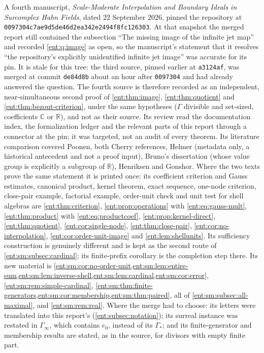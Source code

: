 \documentclass[11pt]{article}
\theoremstyle{plain}
\theoremstyle{plain}
\theoremstyle{plain}
\theoremstyle{definition}
\theoremstyle{definition}
\theoremstyle{definition}
\theoremstyle{definition}
\theoremstyle{remark}
\newcommand{\C}{\mathbb C}\newcommand{\R}{\mathbb R}
\begin{document}
A fourth manuscript, \emph{Scale-Moderate Interpolation and Boundary Ideals
in Surcomplex Hahn Fields}, dated 22 September 2026, pinned the repository
at \texttt{0097304c7ae9d5de46d2\allowbreak ea342e2494f8fc126303}. At that snapshot the
merged report still contained the subsection ``The missing image of the
infinite jet map'' and recorded \cref{ent:q:image} as open, so the
manuscript's statement that it resolves ``the repository's explicitly
unidentified infinite jet image'' was accurate for its pin. It is stale for
this tree: the third source, pinned earlier at \texttt{a3124af}, was merged
at commit \texttt{de84d8b} about an hour after \texttt{0097304} and had
already answered the question. The fourth source is therefore recorded as an
independent, near-simultaneous second proof of \cref{ent:thm:image},
\cref{ent:thm:quotient} and \cref{ent:thm:bezout-criterion}, under the same
hypotheses ($\Gamma$ divisible and set-sized, coefficients $\C$ or $\R$), and
not as their source. Its review read the documentation index, the
formalization ledger and the relevant parts of this report through a
connector at the pin; it was targeted, not an audit of every theorem. Its
literature comparison covered Poonen, both Cherry references, Helmer
(metadata only, a historical antecedent and not a proof input), Bruno's
dissertation (whose value group is explicitly a subgroup of $\R$), Henriksen
and Gonshor. Where the two texts prove the same statement it is printed once:
its coefficient criterion and Gauss estimates, canonical product, kernel
theorem, exact sequence, one-node criterion, close-pair example, factorial
example, order-unit check and unit test for shell algebras are
\cref{ent:thm:criterion}, \cref{ent:prop:operations} with
\eqref{ent:eq:gauss-mult}, \cref{ent:thm:product} with
\eqref{ent:eq:productcoef}, \cref{ent:prop:kernel-direct},
\cref{ent:thm:quotient}, \cref{ent:cor:single-node},
\cref{ent:thm:close-pair}, \cref{ent:cor:no-interpolation},
\cref{ent:cor:order-unit-image} and \cref{ent:lem:shellunits}. Its
sufficiency construction is genuinely different and is kept as the second
route of \cref{ent:sm:subsec:cardinal}; its finite-prefix corollary is the
completion step there. Its new material is
\cref{ent:sm:cor:no-order-unit,ent:sm:lem:entire-sum,ent:sm:lem:inverse-shell,ent:sm:lem:cardinal,ent:sm:cor:error},
\cref{ent:sm:rem:simple-cardinal},
\cref{ent:sm:thm:finite-generators,ent:sm:cor:membership,ent:sm:thm:paired},
all of \cref{ent:sm:subsec:all-maximal}, and \cref{ent:sm:rem:real}. Where
the merge had to choose: its letters were translated into this report's
(\cref{ent:subsec:notation}); its surreal instance was restated in
$\Gamma_\infty$, which contains $e_0$, instead of its $\Gamma_*$; and its
finite-generator and membership results are stated, as in the source, for
divisors with empty finite part.
\end{document}
